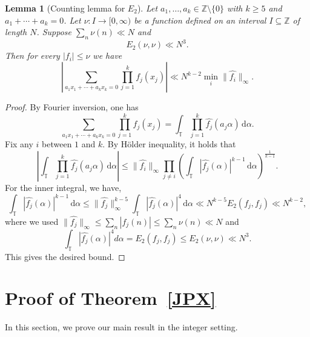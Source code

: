 \documentclass[A4paper,reqno,oneside,12pt]{amsart}
\theoremstyle{plain}
\newtheorem{lemma}[theorem]{Lemma}
\theoremstyle{definition}
\renewcommand{\d}{\,\mathrm{d}}         %
\newcommand{\Z}{\mathbb{Z}}
\newcommand{\TT}{\mathbb{T}}
\begin{document}

\begin{lemma}[Counting lemma for $E_2$]\label{lem: counting}
Let $a_1,\dots,a_k\in\Z \setminus \{0\}$ with $k\geq 5$ and $a_1 +\cdots + a_k = 0$. Let $\nu : I \to [0, \infty)$ be a function defined on an interval $I \subseteq \Z$ of length $N$. Suppose $\sum_n \nu(n)\ll N$ and
\[
E_2(\nu,\nu)\ll N^{3}. 
\]
Then for every $|f_i|\le \nu$ we have
\[
\left| \sum_{a_1x_1+\cdots +a_k x_k = 0} \prod_{j=1}^k f_j(x_j)\right|\ll N^{k-2}\min_i \|\widehat{f_i}\|_\infty. 
\]
\end{lemma}

\begin{proof}
By Fourier inversion,
one has
\[
 \sum_{a_1x_1+\cdots +a_k x_k = 0} \prod_{j=1}^k f_j(x_j)
=\int_\TT \prod_{j=1}^k \widehat{f_j}(a_j\alpha)\d\alpha.
\]
Fix any $i$ between $1$ and $k$. By H\"older inequality, it holds that
\[
\left| \int_\TT \prod_{j=1}^k \widehat{f_j}(a_j\alpha)\d\alpha\right|
\leq \|\widehat{f_i}\|_\infty \prod_{j\neq i}\left(\int_\TT |\widehat{f_j}(\alpha)|^{k-1}\d\alpha\right)^{\frac{1}{k-1}}. 
\]
For the inner integral, we have,
\[
\int_\TT |\widehat{f_j}(\alpha)|^{k-1}\d\alpha
\leq \|\widehat{f_j}\|_\infty^{k-5}\int_{\TT}|\widehat{f_j}(\alpha)|^{4}\d\alpha
\ll N^{k-5}E_2(f_j,f_j)\ll N^{k-2},
\]
where we used $\|\widehat{f_j}\|_\infty\le \sum_n |f_j(n)|\le \sum_n \nu(n)\ll N$ and 
\[
\int_\TT |\widehat{f_j}(\alpha)|^4d\alpha = E_2(f_j,f_j)\le E_2(\nu,\nu)\ll N^3.
\]
This gives the desired bound.
\end{proof}

\section{Proof of Theorem~\ref{JPX}}\label{sec:proof-integers}
In this section, we prove our main result in the integer setting. 
\end{document}

